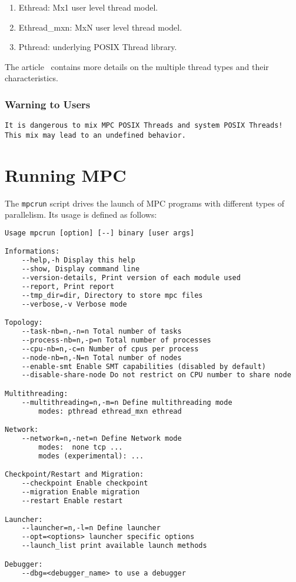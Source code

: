 \documentclass[a4paper,11pt]{article}
\begin{document}
\begin{enumerate}
  \item  Ethread: Mx1 user level thread model.

  \item   Ethread\_mxn: MxN user level thread model.

  \item   Pthread: underlying POSIX Thread library.

\end{enumerate}
The article~\cite{Perache08} contains more details on the multiple thread types and their characteristics.


\subsubsection{Warning to Users}

\begin{lstlisting}[basicstyle=\color{BrickRed}]
It is dangerous to mix MPC POSIX Threads and system POSIX Threads!
This mix may lead to an undefined behavior.
\end{lstlisting}
\section{Running MPC}

The \texttt{mpcrun} script drives the launch of MPC programs with different
types of parallelism.
Its usage is defined as follows:
\begin{lstlisting}[language=TeX]
Usage mpcrun [option] [--] binary [user args]

Informations:
    --help,-h Display this help
    --show, Display command line
    --version-details, Print version of each module used
    --report, Print report
    --tmp_dir=dir, Directory to store mpc files
    --verbose,-v Verbose mode

Topology:
    --task-nb=n,-n=n Total number of tasks
    --process-nb=n,-p=n Total number of processes
    --cpu-nb=n,-c=n Number of cpus per process
    --node-nb=n,-N=n Total number of nodes
    --enable-smt Enable SMT capabilities (disabled by default)
    --disable-share-node Do not restrict on CPU number to share node

Multithreading:
    --multithreading=n,-m=n Define multithreading mode
        modes: pthread ethread_mxn ethread

Network:
    --network=n,-net=n Define Network mode
        modes:  none tcp ...
        modes (experimental): ...

Checkpoint/Restart and Migration:
    --checkpoint Enable checkpoint
    --migration Enable migration
    --restart Enable restart

Launcher:
    --launcher=n,-l=n Define launcher
    --opt=<options> launcher specific options
    --launch_list print available launch methods

Debugger:
    --dbg=<debugger_name> to use a debugger

\end{lstlisting}
\end{document}
